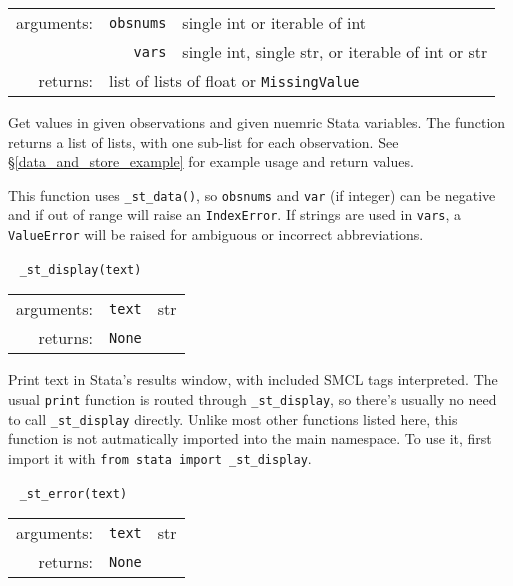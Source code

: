 \documentclass{article}
\begin{document}
			\vspace{1.5mm}
			\noindent 
			\indent \begin{tabular}{rrl}
					arguments: & \texttt{obsnums} & single int or iterable of int \\
					  & \texttt{vars} & single int, single str, or iterable of int or str \\
					returns: & \multicolumn{2}{l}{list of lists of float or \lstinline$MissingValue$}
				\end{tabular}
								
			\vspace{1.5mm}
			\noindent Get values in given observations and given nuemric Stata variables. The function returns a list of lists, with one sub-list for each observation. See \S\ref{data_and_store_example} for example usage and return values. 
			
			This function uses \lstinline{_st_data()}, so \lstinline{obsnums} and \lstinline{var} (if integer) can be negative and if out of range will raise an \lstinline{IndexError}. If strings are used in \lstinline{vars}, a \lstinline{ValueError} will be raised for ambiguous or incorrect abbreviations. \newline
		
		
			\ \newline
			\noindent \lstinline$_st_display(text)$
								
			\vspace{1.5mm}
			\noindent 
			\indent \begin{tabular}{rrl}
					arguments: & \texttt{text} & str \\
					returns: & \multicolumn{2}{l}{\texttt{None}}
				\end{tabular}
								
			\vspace{1.5mm}
			\noindent Print text in Stata's results window, with included \textsc{SMCL} tags interpreted. The usual \texttt{print} function is routed through \lstinline$_st_display$, so there's usually no need to call \lstinline$_st_display$ directly.  Unlike most other functions listed here, this function is not autmatically imported into the main namespace. To use it, first import it with \lstinline{from stata import _st_display}. \newline
			
			
			\ \newline
			\noindent \lstinline$_st_error(text)$
								
			\vspace{1.5mm}
			\noindent
			\indent \begin{tabular}{rrl}
					arguments: & \texttt{text} & str \\
					returns: & \multicolumn{2}{l}{\texttt{None}}
				\end{tabular}
								
\end{document}
